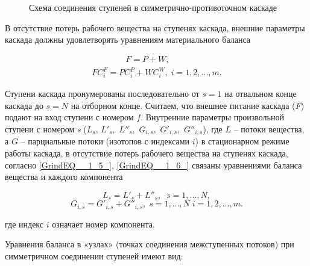 \begin{figure}[ht]
  \caption{Схема соединения ступеней в симметрично-противоточном каскаде}\label{1_2}
\end{figure}

В отсутствие потерь рабочего вещества на ступенях каскада, внешние параметры каскада должны удовлетворять уравнениям материального баланса

\begin{equation} \label{GrindEQ__1_21_} 
  \begin{array}{l} {\quad \quad \quad \quad F=P+W,} \\ {FC_{i}^{F} =PC_{i}^{P} +WC_{i}^{W} ,\; i=1,2,...,m.} \end{array} 
\end{equation} 

Ступени каскада пронумерованы последовательно от $s=1$ на отвальном конце каскада до $s=N$ на отборном конце. Считаем, что внешнее питание каскада (\textit{F}) подают на вход ступени с номером $f$. Внутренние параметры произвольной ступени с номером \textit{s} ($L_{s} $, $L'_{s} ,$ $L''_{s} ,$ $G_{i,s} ,$ $G'_{i,s} ,$ $G''_{i,s} $), где $L$ -- потоки вещества, а $G$ -- парциальные потоки (изотопов с индексами $i$) в стационарном режиме работы каскада, в отсутствие потерь рабочего вещества на ступенях каскада, согласно  \ref{GrindEQ__1_5_},  \ref{GrindEQ__1_6_} связаны уравнениями баланса вещества и каждого компонента

\begin{equation} \label{GrindEQ__1_22_} 
  L_{s} =L'_{s} +L''_{s} ,\; \; s=1,...,N,            
  \end{equation} 
  \begin{equation} \label{GrindEQ__1_23_} 
  G_{i,s} =G'_{i,s} +G''_{i,s} ,\;s=1,...,N \; i=1,2,...,m.           
  \end{equation} 

где индекс $i$ означает номер компонента.

Уравнения баланса в «узлах» (точках соединения межступенных потоков) при симметричном соединении ступеней имеют вид:

